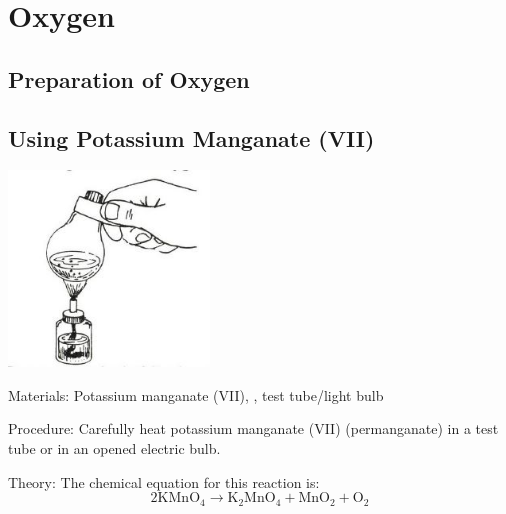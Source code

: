 \section{Oxygen}

\begin{multicols}{2}


\section*{Preparation of Oxygen}


\subsection{Using Potassium Manganate (VII)} %

\begin{center}
\includegraphics[width=0.4\textwidth]{./img/source/oxygen-prep.jpg}
\end{center}

\begin{description*}
\item[Materials:]{Potassium manganate (VII), , test tube/light bulb}
\item[Procedure:]{Carefully heat potassium manganate (VII) (permanganate) in a test
tube or in an opened electric bulb.}
\item[Theory:]{The chemical equation for this reaction is: \[ 2\mathrm{K}\mathrm{Mn}\mathrm{O}_4 \longrightarrow \mathrm{K}_2\mathrm{Mn}\mathrm{O}_4 + \mathrm{Mn}\mathrm{O}_2 + \mathrm{O}_2 \]}
\end{description*}


\end{multicols}
